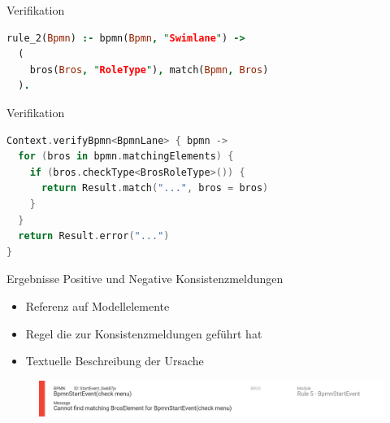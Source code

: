 \begin{frame}[fragile]{Verifikation}
\begin{lstlisting}[language=Prolog]
rule_2(Bpmn) :- bpmn(Bpmn, "Swimlane") ->
  (
    bros(Bros, "RoleType"), match(Bpmn, Bros)
  ).
\end{lstlisting}
\end{frame}
\begin{frame}[fragile]{Verifikation}
\begin{lstlisting}[language=Kotlin]
Context.verifyBpmn<BpmnLane> { bpmn ->
  for (bros in bpmn.matchingElements) {
    if (bros.checkType<BrosRoleType>()) {
      return Result.match("...", bros = bros)
    }
  }
  return Result.error("...")
}
\end{lstlisting}
\end{frame}


\begin{frame}{Ergebnisse}
  Positive und Negative Konsistenzmeldungen
  \begin{itemize}
    \item Referenz auf Modellelemente
    \item Regel die zur Konsistenzmeldungen geführt hat
    \item Textuelle Beschreibung der Ursache
  \end{itemize}
  \begin{figure}
    \centering
    \begin{adjustbox}{width=1\linewidth,center}
      \includegraphics{images/example/error5.png}
    \end{adjustbox}
  \end{figure}
\end{frame}
